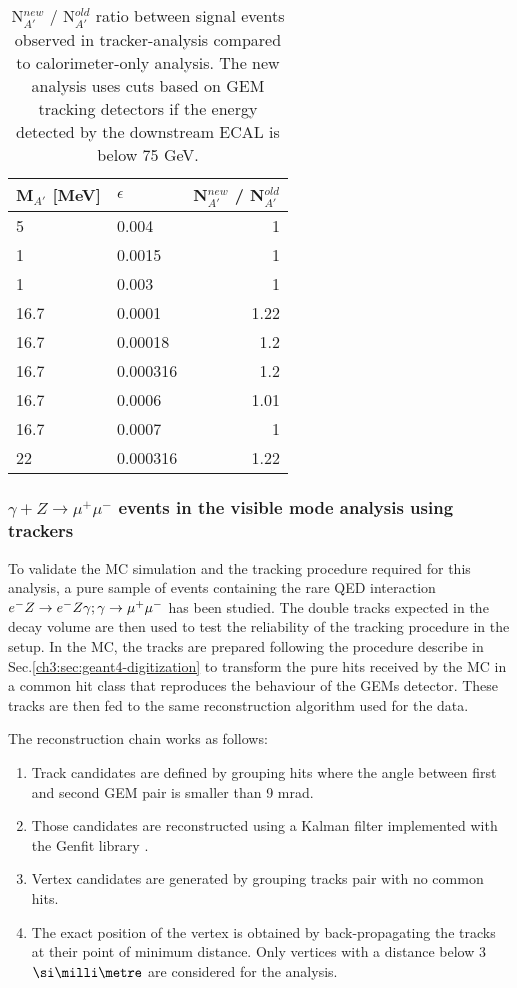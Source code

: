 \begin{table}[h!]
  \centering
  \begin{tabular}{|llr|}
    \hline
    M$_{A'}$ [MeV]& $\epsilon$ & N$^{new}_{A'}$ / N$^{old}_{A'}$ \\    
    \hline
    5    & 0.004    & 1   \\    
    1    & 0.0015   & 1   \\    
    1    & 0.003    & 1   \\    
    16.7 & 0.0001   & 1.22\\
    16.7 & 0.00018  & 1.2 \\    
    16.7 & 0.000316 & 1.2 \\
    16.7 & 0.0006   & 1.01\\
    16.7 & 0.0007   & 1   \\
    22   & 0.000316 & 1.22\\
    \hline    
  \end{tabular}
  \caption[ratio between signal events observed in tracker-analysis compared to calorimeter-only analysis]{N$^{new}_{A'}$ / N$^{old}_{A'}$ ratio between signal events observed in tracker-analysis compared to calorimeter-only analysis. The new analysis uses cuts based on GEM tracking detectors if the energy detected by the downstream ECAL is below 75 GeV.}
  \label{tab:dm:efftable}
\end{table}

\subsubsection{$\gamma + Z \rightarrow \mu^+ \mu^-$ events in the visible mode analysis using trackers}
\label{ch3:sec:vis-mode-tracking-dimuon}

To validate the MC simulation and the tracking procedure required for this analysis, a pure sample of events containing the rare QED interaction $e^- Z \to e^- Z \gamma; \gamma \to \mu^+ \mu^-$ has been studied. The double tracks expected in the decay volume are then used to test the reliability of the tracking procedure in the setup. In the MC, the tracks are prepared following the procedure describe in Sec.\ref{ch3:sec:geant4-digitization} to transform the pure hits received by the MC in a common hit class that reproduces the behaviour of the GEMs detector. These tracks are then fed to the same reconstruction algorithm used for the data.

The reconstruction chain works as follows:
\begin{enumerate}
\item Track candidates are defined by grouping hits where the angle between first and second GEM pair is smaller than 9 mrad.
\item Those candidates are reconstructed using a Kalman filter implemented with the Genfit library \cite{genfit}.
\item Vertex candidates are generated by grouping tracks pair with no common hits.
\item The exact position of the vertex is obtained by back-propagating the tracks at their point of minimum distance. Only vertices with a distance below 3 $\mmi$ are considered for the analysis.
\end{enumerate}

